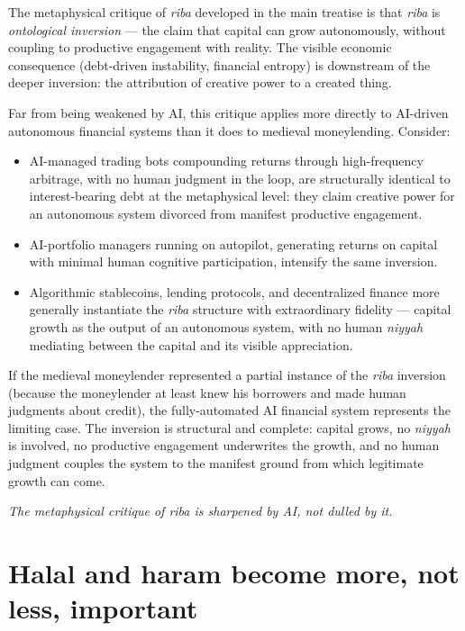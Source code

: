 \documentclass[11pt,a4paper]{article}
\newcommand{\arb}[1]{\textit{#1}}
\begin{document}
The metaphysical critique of \arb{riba} developed in the main
treatise is that \arb{riba} is \textit{ontological inversion} ---
the claim that capital can grow autonomously, without coupling to
productive engagement with reality. The visible economic
consequence (debt-driven instability, financial entropy) is
downstream of the deeper inversion: the attribution of creative
power to a created thing.

Far from being weakened by AI, this critique applies more directly
to AI-driven autonomous financial systems than it does to medieval
moneylending. Consider:

\begin{itemize}[leftmargin=2em]
    \item AI-managed trading bots compounding returns through
    high-frequency arbitrage, with no human judgment in the loop,
    are structurally identical to interest-bearing debt at the
    metaphysical level: they claim creative power for an autonomous
    system divorced from manifest productive engagement.

    \item AI-portfolio managers running on autopilot, generating
    returns on capital with minimal human cognitive participation,
    intensify the same inversion.

    \item Algorithmic stablecoins, lending protocols, and
    decentralized finance more generally instantiate the
    \arb{riba} structure with extraordinary fidelity --- capital
    growth as the output of an autonomous system, with no
    human \arb{niyyah} mediating between the capital and its
    visible appreciation.
\end{itemize}

If the medieval moneylender represented a partial instance of the
\arb{riba} inversion (because the moneylender at least knew his
borrowers and made human judgments about credit), the
fully-automated AI financial system represents the limiting case.
The inversion is structural and complete: capital grows, no
\arb{niyyah} is involved, no productive engagement underwrites the
growth, and no human judgment couples the system to the manifest
ground from which legitimate growth can come.

\textit{The metaphysical critique of \arb{riba} is sharpened by AI,
not dulled by it.}

\section{Halal and haram become more, not less, important}
\label{sec:halal-haram}
\end{document}
